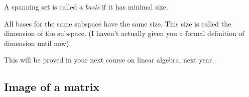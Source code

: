 \documentclass{article}
\begin{document}
\begin{Definition}
A spanning set is called a {\em basis} if it has minimal size.


\end{Definition}
\begin{Theorem}
All bases for the same subspace have the same size. This size is
called the dimension of the subspace. (I haven't actually given you
a formal definition of dimension until now).
\end{Theorem}
\begin{Proof}
This will be proved in your next course on linear algebra, next
year. \qedhere


\end{Proof}
\subsection{Image of a matrix}
\end{document}
